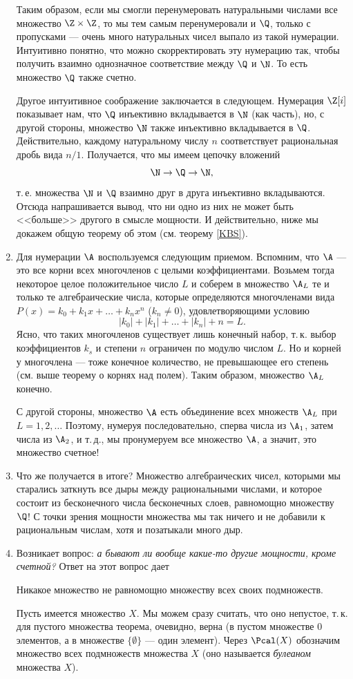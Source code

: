 \begin{enumerate}
Таким образом, если мы смогли перенумеровать натуральными числами все множество $\Z\times\Z$, то мы тем самым перенумеровали и $\Q$, только с пропусками --- очень много натуральных чисел выпало из такой нумерации. Интуитивно понятно, что можно скорректировать эту нумерацию так, чтобы получить взаимно однозначное соответствие между $\Q$ и $\N$. То есть множество $\Q$ также счетно.

Другое интуитивное соображение заключается в следующем. Нумерация $\Z[i]$ показывает нам, что $\Q$ инъективно вкладывается в $\N$ (как часть), но, с другой стороны, множество $\N$ также инъективно вкладывается в $\Q$. Действительно, каждому натуральному числу $n$ соответствует рациональная дробь вида $n/1$. Получается, что мы имеем цепочку вложений
$$
\N\to\Q\to\N,
$$
т.\,е. множества $\N$ и $\Q$ взаимно друг в друга инъективно вкладываются. Отсюда напрашивается вывод, что ни одно из них не может быть <<больше>> другого в смысле мощности. И действительно, ниже мы докажем общую теорему об этом (см. теорему \ref{KBS}).

\item Для нумерации $\A$ воспользуемся следующим приемом. Вспомним, что $\A$ --- это все корни всех многочленов с целыми коэффициентами. Возьмем тогда некоторое целое положительное число $L$ и соберем в множество $\A_L$ те и только те алгебраические числа, которые определяются многочленами вида $P(x)=k_0+k_1x+\dots+k_nx^n$ ($k_n\ne 0$), удовлетворяющими условию
$$
|k_0|+|k_1|+\dots+|k_n|+n=L.
$$
Ясно, что таких многочленов существует лишь конечный набор, т.\,к. выбор коэффициентов $k_s$ и степени $n$ ограничен по модулю числом $L$. Но и корней у многочлена --- тоже конечное количество, не превышающее его степень (см. выше теорему о корнях над полем). Таким образом, множество $\A_L$ конечно.

С другой стороны, множество $\A$ есть объединение всех множеств $\A_L$ при $L=1,2,\dots$ Поэтому, нумеруя последовательно, сперва числа из $\A_1$, затем числа из $\A_2$, и т.\,д., мы пронумеруем все множество $\A$, а значит, это множество счетное!

\item Что же получается в итоге? Множество алгебраических чисел, которыми мы старались заткнуть все дыры между рациональными числами, и которое состоит из бесконечного числа бесконечных слоев, равномощно множеству $\Q$! С точки зрения мощности множества мы так ничего и не добавили к рациональным числам, хотя и позатыкали много дыр.
\item Возникает вопрос: \textit{а бывают ли вообще какие-то другие мощности, кроме счетной?} Ответ на этот вопрос дает
\begin{thrm}[Кантора]
Никакое множество не равномощно множеству всех своих подмножеств.
\end{thrm}
\pf
Пусть имеется множество $X$. Мы можем сразу считать, что оно непустое, т.\,к. для пустого множества теорема, очевидно, верна (в пустом множестве 0 элементов, а в множестве $\{\emptyset\}$ --- один элемент). Через $\Pcal(X)$ обозначим множество всех подмножеств множества $X$ (оно называется \textit{булеаном} множества $X$).


\end{enumerate}
